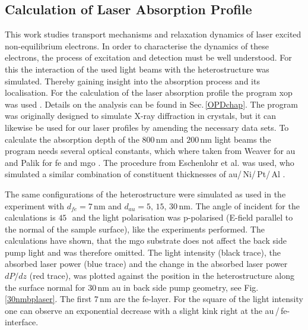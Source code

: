 \documentclass[a4paper,12pt,twoside]{article}
\begin{document}
    \subsection{Calculation of Laser Absorption Profile}
        \label{CLAPchap}
This work studies transport mechanisms and relaxation dynamics of laser excited non-equilibrium electrons. In order to characterise the dynamics of these electrons, the process of excitation and detection must be well understood. For this the interaction of the used light beams with the heterostructure was simulated. Thereby gaining insight into the absorption process and its localisation.
For the calculation of the laser absorption profile the program \gls{xop} was used \cite{Laserprog,Dejus1996}. Details on the analysis can be found in Sec.\,\ref{OPDchap}. The program was originally designed to simulate X-ray diffraction in crystals, but it can likewise be used for our laser profiles by amending the necessary data sets. To calculate the absorption depth of the $800\,\mathrm{\mbox{nm}}$ and $200\,\mathrm{\mbox{nm}}$ light beams the program needs several optical constants, which where taken from Weaver for \gls{au} and Palik for \gls{fe} and \gls{mgo} \cite{weaver1981optical2,palik1991handbook}. The procedure from Eschenlohr et al. was used, who simulated a similar combination of constituent thicknesses of \gls{au}/\,Ni/\,Pt/\,Al \cite{Eschenlohr2014}. 



	
The same configurations of the heterostructure were simulated as used in the experiment with $d_{fe} = 7\,\mathrm{nm}$ and $d_{au} = 5,\,15,\,30\,\mathrm{nm}$. The angle of incident for the calculations is $45\,$\textdegree\, and the light polarisation was p-polarised (E-field parallel to the normal of the sample surface), like the experiments performed. The calculations have shown, that the \gls{mgo} substrate does not affect the back side pump light and was therefore omitted. The light intensity (black trace), the absorbed laser power (blue trace) and the change in the absorbed laser power $dP/dz$ (red trace), was plotted against the position in the heterostructure along the surface normal for $30\,\mathrm{\mbox{nm}}$ \gls{au} in back side pump geometry, see Fig.\,\ref{30nmbplaser}. The first $7\,\mathrm{nm}$ are the \gls{fe}-layer. For the square of the light intensity one can observe an exponential decrease with a slight kink right at the \gls{au}\,/\,\gls{fe}-interface.
	 
\end{document}
